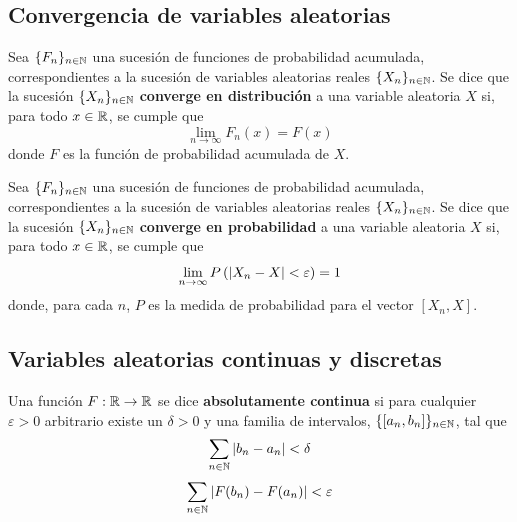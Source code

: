
\subsection{Convergencia de variables aleatorias}

\begin{definicion}
Sea $\{ F_n \}_{n\in \mathbb{N}}$ una sucesión de funciones de probabilidad acumulada, correspondientes a la sucesión de variables aleatorias reales $\{ X_n \}_{n\in \mathbb{N}}$. Se dice que la sucesión $\{ X_n \}_{n\in \mathbb{N}}$ \textbf{converge en distribución} a una variable aleatoria $X$ si, para todo $x\in \mathbb{R}$, se cumple que
\begin{equation}
\lim_{n\rightarrow\infty} F_n(x) = F(x)
\end{equation}
donde $F$ es la función de probabilidad acumulada de $X$.
\end{definicion}

\begin{definicion}
Sea $\{ F_n \}_{n\in \mathbb{N}}$ una sucesión de funciones de probabilidad acumulada, correspondientes a la sucesión de variables aleatorias reales $\{ X_n \}_{n\in \mathbb{N}}$. Se dice que la sucesión $\{ X_n \}_{n\in \mathbb{N}}$ \textbf{converge en probabilidad} a una variable aleatoria $X$ si, para todo $x\in \mathbb{R}$, se cumple que
\begin{equation}
\lim_{n\rightarrow\infty} P\left( \left| X_n-X \right| < \varepsilon \right) = 1
\end{equation}
donde, para cada $n$, $P$ es la medida de probabilidad para el vector $[X_n, X]$.
\end{definicion}


\subsection{Variables aleatorias continuas y discretas}

\begin{definicion}
Una función $F: \mathbb{R} \rightarrow \mathbb{R}$ se dice \textbf{absolutamente continua} si para cualquier $\varepsilon>0$ arbitrario existe un $\delta>0$ y una familia de intervalos, $\{ [a_n, b_n]\}_{n\in \mathbb{N}}$, tal que
\begin{equation}
\sum_{n\in \mathbb{N}} \left| b_n - a_n \right| < \delta 
\end{equation}
\begin{equation}
\sum_{n\in \mathbb{N}} \left| F(b_n) - F(a_n) \right| < \varepsilon 
\end{equation}
\end{definicion}

